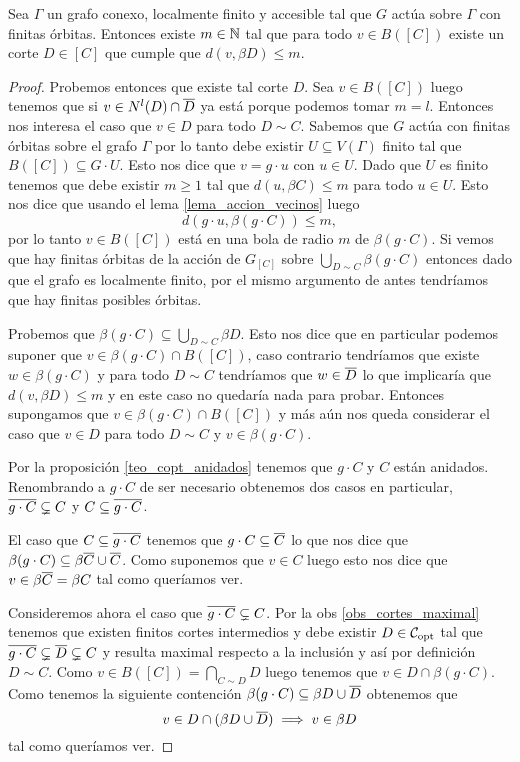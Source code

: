 \documentclass[tesis.tex]{subfiles}
\begin{document}
\begin{lema}\label{lema_existe_m_borde_corte}
	Sea $\Gamma$ un grafo conexo, localmente finito y accesible tal que $G$ actúa sobre $\Gamma$ con finitas órbitas.
	Entonces existe $m \in \mathbb{N}$ tal que para todo $v \in B([C])$ existe un corte $D \in [C]$ que cumple que
	$d(v,\beta D) \le m$.
\end{lema}
\begin{proof}
	Probemos entonces que existe tal corte $D$.
	Sea $v \in B([C])$ luego tenemos que si $v \in N^l(D) \cap \overline D$ ya está porque podemos tomar $m=l$.
	Entonces nos interesa el caso que $v \in D$ para todo $D \sim C$.
	Sabemos que $G$ actúa con finitas órbitas sobre el grafo $\Gamma$ por lo tanto debe existir $U \subseteq V(\Gamma)$ finito tal que $B([C]) \subseteq G \cdot U$.
	Esto nos dice que $v = g \cdot u$ con $u \in U$.
	Dado que $U$ es finito tenemos que debe existir $m \ge 1$ tal que $d(u,\beta C) \le m$ para todo $u \in U$.
	Esto nos dice que usando el lema \ref{lema_accion_vecinos} luego
	\[
	d(g \cdot u, \beta (g \cdot C)) \le m,
	\]
	por lo tanto $v \in B([C])$ está en una bola de radio $m$ de $\beta (g \cdot C)$.
	Si vemos que hay finitas órbitas de la acción de $G_{[C]}$ sobre $\bigcup_{D \sim C} \beta (g \cdot C)$ entonces dado que el grafo es localmente finito, por el mismo argumento de antes tendríamos que hay finitas posibles órbitas.
	
	Probemos que $\beta (g \cdot C) \subseteq \bigcup_{D \sim C} \beta D$.
	Esto nos dice que en particular podemos suponer que $v \in \beta (g \cdot C) \cap B([C])$, caso contrario tendríamos que existe $w \in \beta (g \cdot C)$ y para todo $D \sim C$ tendríamos que $w \in \overline D$ lo que implicaría  que $d(v,\beta D) \le m$ y en este caso no quedaría nada para probar.
	Entonces supongamos que $ v \in \beta (g \cdot C) \cap B([C])$ y más aún nos queda considerar el caso que $v \in D$ para todo $D \sim C$ y $v \in \beta (g \cdot C)$.
	
	Por la proposición \ref{teo_copt_anidados} tenemos que $g \cdot C$ y $C$ están anidados.
	Renombrando a $g \cdot C$ de ser necesario obtenemos dos casos en particular, $\overline{ g \cdot C} \subsetneq C$ y $C \subseteq \overline {g \cdot C}$.
	
	El caso que $C \subseteq \overline{ g \cdot C}$ tenemos que $ g \cdot C \subseteq \overline C$ lo que nos dice que $\beta (g \cdot C) \subseteq \beta \overline C \cup \overline C$.
	Como suponemos que $v \in C$ luego esto nos dice que $v \in \beta \overline C = \beta C$ tal como queríamos ver.
	
	Consideremos ahora el caso que ${\overline{ g \cdot C}} \subsetneq C$.
	Por la obs \ref{obs_cortes_maximal} tenemos que existen finitos cortes intermedios y debe existir $D \in {\cal C}_{\text{opt}}$ tal que 
	$\overline{g \cdot C}  \subsetneq \overline D \subsetneq C$ y resulta maximal respecto a la inclusión y así por definición $D \sim C$.
	Como $v \in B([C]) = \bigcap_{C \sim D} D $ luego tenemos que $v \in D \cap \beta (g \cdot C)$.
	Como tenemos la siguiente contención $\beta (g \cdot C) \subseteq \beta D \cup \overline D$ obtenemos que
	\[
	v \in D \cap (\beta D \cup \overline D) \implies v \in \beta D
	\]
	tal como queríamos ver.
\end{proof}
\end{document}
